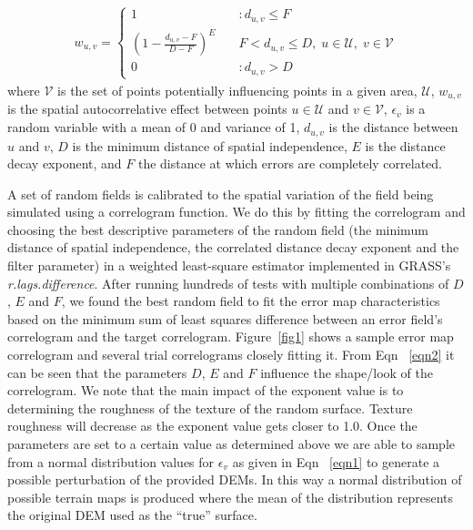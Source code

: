 \documentclass[12pt]{article}
\begin{document}
 \begin{align}
   w_{u,v} = \left\{ \begin{array}{ll} 1 & \quad :d_{u,v} \le F \\
       \left(1- \frac{d_{u,v} - F}{D - F} \right)^E & \quad F <
       d_{u,v} \le D, \; u \in \mathcal{U}, \; v \in \mathcal{V}\\ 0 &
       \quad :d_{u,v} > D
\end{array} \right.
\label{eqn2}                                                    
\end{align}
where $\mathcal{V}$ is the set of points potentially influencing
points in a given area, $\mathcal{U}$, $w_{u,v}$ is the spatial
autocorrelative effect between points $u \in \mathcal{U}$ and $v \in
\mathcal{V}$, $\epsilon_v$ is a random variable with a mean of 0 and
variance of 1, $d_{u,v}$ is the distance between $u$ and $v$, $D$ is
the minimum distance of spatial independence, $E$ is the distance
decay exponent, and $F$ the distance at which errors are completely
correlated.

A set of random fields is calibrated to the spatial variation of the
field being simulated using a correlogram function. We do this by
fitting the correlogram and choosing the best descriptive parameters
of the random field (the minimum distance of spatial independence, the
correlated distance decay exponent and the filter parameter) in a
weighted least-square estimator implemented in GRASS's
\textit{r.lags.difference}.  After running hundreds of tests with
multiple combinations of $D$, $E$ and $F$, we found the best random
field to fit the error map characteristics based on the minimum sum of
least squares difference between an error field's correlogram and the
target correlogram.
Figure~\ref{fig1} shows a sample error map correlogram and several
trial correlograms closely fitting it.  From Eqn ~\ref{eqn2} it can be
seen that the parameters $D$, $E$ and $F$ influence the shape/look of
the correlogram.  We note that the main impact of the exponent value
is to determining the roughness of the texture of the random
surface. Texture roughness will decrease as the exponent value gets
closer to 1.0.  Once the parameters are set to a certain value as
determined above we are able to sample from a normal distribution
values for $\epsilon_v$ as given in Eqn ~\ref{eqn1} to generate a
possible perturbation of the provided DEMs. In this way a normal
distribution of possible terrain maps is produced where the mean of
the distribution represents the original DEM used as the ``true''
surface.
\end{document}
